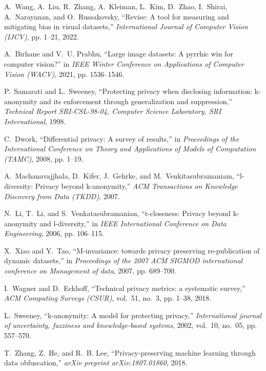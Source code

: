 \documentclass[journal]{IEEEtran}
\begin{document}
\begin{thebibliography}{100}
A.~Wang, A.~Liu, R.~Zhang, A.~Kleiman, L.~Kim, D.~Zhao, I.~Shirai,
  A.~Narayanan, and O.~Russakovsky, ``Revise: A tool for measuring and mitigating bias in visual datasets,'' \emph{International Journal of Computer Vision (IJCV)}, pp. 1--21, 2022.

A.~Birhane and V.~U. Prabhu, ``Large image datasets: A pyrrhic win for computer vision?'' in \emph{IEEE Winter Conference on Applications of Computer Vision (WACV)}, 2021, pp.
  1536--1546.

P.~Samarati and L.~Sweeney, ``Protecting privacy when disclosing information: k-anonymity and its enforcement through generalization and suppression,'' \emph{Technical Report {SRI-CSL-98-04}, Computer Science Laboratory, {SRI} International}, 1998.

C.~Dwork, ``Differential privacy: A survey of results,'' in \emph{Proceedings of the International Conference on Theory and Applications of Models of Computation (TAMC)}, 2008, pp. 1--19.

A.~Machanavajjhala, D.~Kifer, J.~Gehrke, and M.~Venkitasubramaniam,
  ``l-diversity: Privacy beyond k-anonymity,'' \emph{ACM Transactions on Knowledge Discovery from Data (TKDD)}, 2007.

N.~Li, T.~Li, and S.~Venkatasubramanian, ``t-closeness: Privacy beyond k-anonymity and l-diversity,'' in \emph{ IEEE International Conference on Data Engineering}, 2006, pp. 106--115.

X.~Xiao and Y.~Tao, ``M-invariance: towards privacy preserving re-publication of dynamic datasets,'' in \emph{Proceedings of the 2007 ACM SIGMOD
  international conference on Management of data}, 2007, pp. 689--700.

I.~Wagner and D.~Eckhoff, ``Technical privacy metrics: a systematic survey,'' \emph{ACM Computing Surveys (CSUR)}, vol.~51, no.~3, pp. 1--38, 2018.

L.~Sweeney, ``k-anonymity: A model for protecting privacy,''
  \emph{International journal of uncertainty, fuzziness and knowledge-based systems}, 2002, vol.~10, no.~05, pp. 557--570.

T.~Zhang, Z.~He, and R.~B. Lee, ``Privacy-preserving machine learning through data obfuscation,'' \emph{arXiv preprint arXiv:1807.01860}, 2018.


\end{thebibliography}
\end{document}
